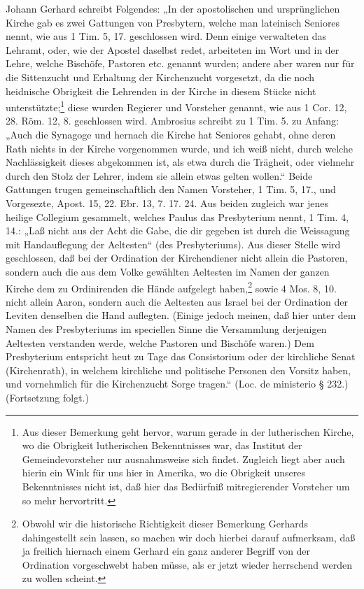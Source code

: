 Johann Gerhard schreibt Folgendes: „In der apostolischen und
ursprünglichen Kirche gab es zwei Gattungen von Presbytern, welche man lateinisch Seniores nennt, wie aus 1 Tim. 5, 17. geschlossen wird. Denn einige verwalteten das Lehramt, oder, wie der Apostel daselbst redet, arbeiteten im Wort und in der Lehre, welche Bischöfe, Pastoren etc. genannt wurden; andere aber waren nur für die Sittenzucht und Erhaltung der Kirchenzucht vorgesetzt, da die noch heidnische Obrigkeit die Lehrenden in der Kirche in diesem Stücke nicht unterstützte;\footnote{Aus dieser Bemerkung geht hervor, warum gerade in der lutherischen Kirche, wo die Obrigkeit lutherischen Bekenntnisses war, das Institut der Gemeindevorsteher nur ausnahmsweise sich findet. Zugleich liegt aber auch hierin ein Wink für uns hier in Amerika, wo die Obrigkeit unseres Bekenntnisses nicht ist, daß hier das Bedürfniß mitregierender Vorsteher um so mehr hervortritt.} diese wurden Regierer und Vorsteher genannt, wie aus 1 Cor. 12, 28. Röm. 12, 8. geschlossen wird. Ambrosius schreibt zu 1 Tim. 5. zu Anfang: „Auch die Synagoge und hernach die Kirche hat Seniores gehabt, ohne deren Rath nichts in der Kirche vorgenommen wurde, und ich weiß nicht, durch welche Nachlässigkeit dieses abgekommen ist, als etwa durch die Trägheit, oder vielmehr durch den Stolz der Lehrer, indem sie allein etwas gelten wollen.“ Beide Gattungen trugen gemeinschaftlich den Namen Vorsteher, 1 Tim. 5, 17., und Vorgesezte, Apost. 15, 22. Ebr. 13, 7. 17. 24. Aus beiden zugleich war jenes heilige Collegium gesammelt, welches Paulus das Presbyterium nennt, 1 Tim. 4, 14.: „Laß nicht aus der Acht die Gabe, die dir gegeben ist durch die Weissagung mit Handauflegung der Aeltesten“ (des Presbyteriums). Aus dieser Stelle wird geschlossen, daß bei der Ordination der Kirchendiener nicht allein die Pastoren, sondern auch die aus dem Volke gewählten Aeltesten im Namen der ganzen Kirche dem zu Ordinirenden die Hände aufgelegt haben,\footnote{Obwohl wir die historische Richtigkeit dieser Bemerkung Gerhards dahingestellt sein lassen, so machen wir doch hierbei darauf aufmerksam, daß ja freilich hiernach einem Gerhard ein ganz anderer Begriff von der Ordination vorgeschwebt haben müsse, als er jetzt wieder herrschend werden zu wollen scheint.} sowie 4 Mos. 8, 10. nicht allein Aaron, sondern auch die Aeltesten aus Israel bei der Ordination der Leviten denselben die Hand auflegten. (Einige jedoch meinen, daß hier unter dem Namen des Presbyteriums im speciellen Sinne die Versammlung derjenigen Aeltesten verstanden werde, welche Pastoren und Bischöfe waren.) Dem Presbyterium entspricht heut zu Tage das Consistorium oder der kirchliche Senat (Kirchenrath), in welchem kirchliche und politische Personen den Vorsitz haben, und vornehmlich für die Kirchenzucht Sorge tragen.“ (Loc. de ministerio § 232.) (Fortsetzung folgt.)
